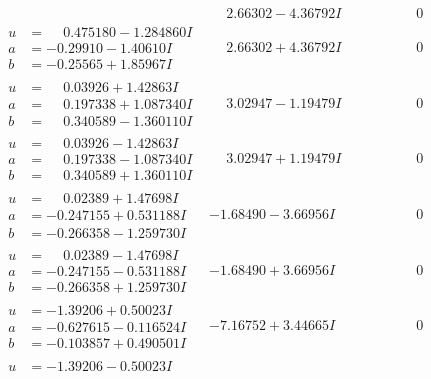 \documentclass[1p]{elsarticle_modified}
\theoremstyle{definition}
\begin{document}
$$\begin{array}{c|c|c}
 & \phantom{-}2.66302 - 4.36792 I & \phantom{-0.000000 } 0 \\ \hline\begin{aligned}
u &= \phantom{-}0.475180 - 1.284860 I \\
a &= -0.29910 - 1.40610 I \\
b &= -0.25565 + 1.85967 I\end{aligned}
 & \phantom{-}2.66302 + 4.36792 I & \phantom{-0.000000 } 0 \\ \hline\begin{aligned}
u &= \phantom{-}0.03926 + 1.42863 I \\
a &= \phantom{-}0.197338 + 1.087340 I \\
b &= \phantom{-}0.340589 - 1.360110 I\end{aligned}
 & \phantom{-}3.02947 - 1.19479 I & \phantom{-0.000000 } 0 \\ \hline\begin{aligned}
u &= \phantom{-}0.03926 - 1.42863 I \\
a &= \phantom{-}0.197338 - 1.087340 I \\
b &= \phantom{-}0.340589 + 1.360110 I\end{aligned}
 & \phantom{-}3.02947 + 1.19479 I & \phantom{-0.000000 } 0 \\ \hline\begin{aligned}
u &= \phantom{-}0.02389 + 1.47698 I \\
a &= -0.247155 + 0.531188 I \\
b &= -0.266358 - 1.259730 I\end{aligned}
 & -1.68490 - 3.66956 I & \phantom{-0.000000 } 0 \\ \hline\begin{aligned}
u &= \phantom{-}0.02389 - 1.47698 I \\
a &= -0.247155 - 0.531188 I \\
b &= -0.266358 + 1.259730 I\end{aligned}
 & -1.68490 + 3.66956 I & \phantom{-0.000000 } 0 \\ \hline\begin{aligned}
u &= -1.39206 + 0.50023 I \\
a &= -0.627615 - 0.116524 I \\
b &= -0.103857 + 0.490501 I\end{aligned}
 & -7.16752 + 3.44665 I & \phantom{-0.000000 } 0 \\ \hline\begin{aligned}
u &= -1.39206 - 0.50023 I \\

\end{aligned}
\end{array}$$
\end{document}

